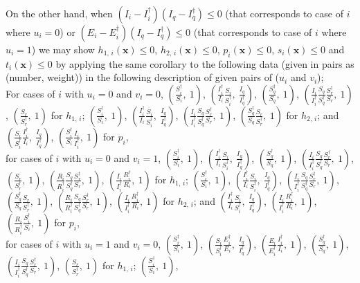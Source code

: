 \documentclass[a4paper]{article}
\begin{document}
On the other hand, when  $(I_i-I^\dagger _i)(I_q-I^\dagger _q)\leqslant0$ (that corresponds to case of $i$ where $u_i=0$) or   $(E_i-E^\dagger _i)(I_q-I^\dagger _q)\leq0$ (that corresponds to case of $i$ where $u_i=1$) we may show $h_{1,\,i}(\mathbf x)\leqslant0$, $h_{2,\,i}(\mathbf x)\leqslant0$, $p_{i}(\mathbf x)\leqslant 0$, $s_{i}(\mathbf x)\leqslant 0$ and $t_{i}(\mathbf x)\leqslant 0$ by applying the same corollary to the following data (given in pairs as (number, weight)) in the following description of given pairs of ($u_i$ and $v_i$); \\For cases of $i$ with $u_i=0$ and $v_i=0$,    $\left(\frac{S_i^\dagger }{S_i},~1\right)$, $\left(\frac{I_i^\dagger }{I_i}\frac{S_i}{S^\dagger _i},~ \frac{I_q}{I^\dagger _q}\right)$, $\left(\frac{S^\dagger _q}{S_q},~ 1\right)$, $\left(\frac{I_i}{I^\dagger _i}\frac{S_q}{S^\dagger _q} \frac{S^\dagger _r}{S_r},~ 1 \right)$, $\left(\frac{S_r}{S^\dagger _r},~1\right)$ for $h_{1,\,i}$;  $\left(\frac{S_i^\dagger }{S_i},~1\right)$, $\left(\frac{I_i^\dagger }{I_i}\frac{S_i}{S^\dagger _i},~ \frac{I_q}{I^\dagger _q}\right)$, $\left(\frac{I_i}{I^\dagger _i}\frac{S_q}{S^\dagger _q} \frac{S^\dagger _r}{S_r},~1\right)$, $\left(\frac{S^\dagger _q}{S_q}\frac{S_r}{S^\dagger _r},~ 1\right)$ for $h_{2,\,i}$; and $\left(\frac{S_i}{S^\dagger _i} \frac{I^\dagger _i}{I_i},~\frac{I_q}{I^\dagger _q}\right)$, $\left(\frac{S^\dagger _i}{S_i}\frac{I_i}{I^\dagger _i},~1\right)$  for $p_i$, \\for cases of $i$ with $u_i=0$ and $v_i=1$,    $\left(\frac{S_i^\dagger }{S_i},~1\right)$, $\left(\frac{I_i^\dagger }{I_i}\frac{S_i}{S^\dagger _i},~ \frac{I_q}{I^\dagger _q}\right)$, $\left(\frac{S^\dagger _q}{S_q},~ 1\right)$, $\left(\frac{I_i}{I^\dagger _i}\frac{S_q}{S^\dagger _q} \frac{S^\dagger _r}{S_r},~ 1 \right)$, $\left(\frac{S_r}{S^\dagger _r},~1\right)$, $\left(\frac{R_i}{R^\dagger _i}\frac{S_q}{S^\dagger _q} \frac{S^\dagger _r}{S_r},~1\right)$, $\left(\frac{I_i}{I^\dagger_i}\frac{R^\dagger_i}{R _i},~1\right)$  for $h_{1,\,i}$;  $\left(\frac{S_i^\dagger }{S_i},~1\right)$, $\left(\frac{I_i^\dagger }{I_i}\frac{S_i}{S^\dagger _i},~ \frac{I_q}{I^\dagger _q}\right)$, $\left(\frac{I_i}{I^\dagger _i}\frac{S_q}{S^\dagger _q} \frac{S^\dagger _r}{S_r},~1\right)$, $\left(\frac{S^\dagger _q}{S_q}\frac{S_r}{S^\dagger _r},~ 1\right)$, $\left(\frac{R_i}{R^\dagger _i}\frac{S_q}{S^\dagger _q} \frac{S^\dagger _r}{S_r},~1\right)$, $\left(\frac{I_i}{I^\dagger_i}\frac{R^\dagger_i}{R _i},~1\right)$ for $h_{2,\,i}$; and $\left( \frac{I^\dagger _i}{I_i}\frac{S_i}{S^\dagger _i},~\frac{I_q}{I^\dagger _q}\right)$, $\left(\frac{I_i}{I^\dagger _i}\frac{R^\dagger _i}{R_i},~1\right)$, $\left(\frac{R_i}{R^\dagger _i}\frac{S^\dagger _i}{S_i},~1\right)$  for $p_i$, \\for cases of $i$ with $u_i=1$ and $v_i=0$,    $\left(\frac{S_i^\dagger }{S_i},~1\right)$, $\left(\frac{S_i}{S^\dagger _i}\frac{E_i^\dagger }{E_i},~ \frac{I_q}{I^\dagger _q}\right)$, $\left(\frac{E_i}{E^\dagger _i}\frac{I_i^\dagger }{I_i},~ 1\right)$, $\left(\frac{S^\dagger _q}{S_q},~ 1\right)$, $\left(\frac{I_i}{I^\dagger _i}\frac{S_q}{S^\dagger _q} \frac{S^\dagger _r}{S_r},~ 1 \right)$, $\left(\frac{S_r}{S^\dagger _r},~1\right)$  for $h_{1,\,i}$;  $\left(\frac{S_i^\dagger }{S_i},~1\right)$, 
\end{document}
